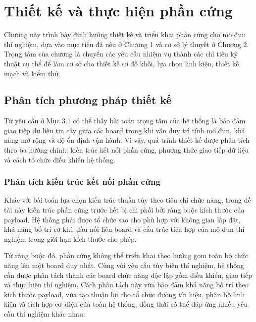 ﻿%

\chapter{Thiết kế và thực hiện phần cứng}
\label{ch:thiet_ke_phan_cung}

Chương này trình bày định hướng thiết kế và triển khai phần cứng cho mô đun thí nghiệm, dựa vào mục tiêu đã nêu ở Chương 1 và cơ sở lý thuyết ở Chương 2. Trọng tâm của chương là chuyển các yêu cầu nhiệm vụ thành các chỉ tiêu kỹ thuật cụ thể để làm cơ sở cho thiết kế sơ đồ khối, lựa chọn linh kiện, thiết kế mạch và kiểm thử.

\section{Phân tích phương pháp thiết kế}
\label{sec:phan_tich_phuong_phap}

Từ yêu cầu ở Mục 3.1 có thể thấy bài toán trọng tâm của hệ thống là bảo đảm giao tiếp dữ liệu tin cậy giữa các board trong khi vẫn duy trì tính mô đun, khả năng mở rộng và độ ổn định vận hành. Vì vậy, quá trình thiết kế được phân tích theo ba hướng chính: kiến trúc kết nối phần cứng, phương thức giao tiếp dữ liệu và cách tổ chức điều khiển hệ thống.

\subsection{Phân tích kiến trúc kết nối phần cứng}
\label{subsec:phan_tich_kien_truc_ket_noi}

Khác với bài toán lựa chọn kiến trúc thuần túy theo tiêu chí chức năng, trong đề tài này kiến trúc phần cứng trước hết bị chi phối bởi ràng buộc kích thước của payload. Hệ thống phải được tổ chức sao cho phù hợp với không gian lắp đặt, khả năng bố trí cơ khí, đầu nối liên board và cấu trúc tích hợp của mô đun thí nghiệm trong giới hạn kích thước cho phép.

Từ ràng buộc đó, phần cứng không thể triển khai theo hướng gom toàn bộ chức năng lên một board duy nhất. Cùng với yêu cầu tùy biến thí nghiệm, hệ thống cần được phân tách thành các board chức năng độc lập gồm điều khiển, giao tiếp và thực hiện thí nghiệm. Cách phân tách này vừa bảo đảm khả năng bố trí theo kích thước payload, vừa tạo thuận lợi cho tổ chức đường tín hiệu, phân bố linh kiện và tích hợp cơ--điện của toàn hệ thống, đồng thời có thể đáp ứng nhiều yêu cầu thí nghiệm khác nhau.

